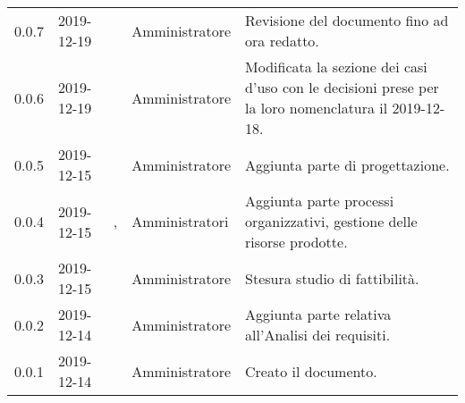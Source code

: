 {\begin{longtable}{C{2cm} C{2cm}  C{3cm}  C{3cm} C{4.5cm}}
0.0.7 & 2019-12-19 & \SE{} & Amministratore & Revisione del documento fino ad ora redatto. \\

0.0.6 & 2019-12-19 & \CE{} & Amministratore & Modificata la sezione dei casi d’uso con le decisioni prese per la loro nomenclatura il 2019-12-18. \\

0.0.5 & 2019-12-15 & \SE{} & Amministratore & Aggiunta parte di progettazione. \\

0.0.4 & 2019-12-15 & \BR{}, \PF{}  & Amministratori & Aggiunta parte processi organizzativi, gestione delle risorse prodotte. \\

0.0.3 & 2019-12-15 & \MC{} & Amministratore & Stesura studio di fattibilità. \\

0.0.2 & 2019-12-14 & \CE{} & Amministratore & Aggiunta parte relativa all’Analisi dei requisiti. \\

0.0.1 & 2019-12-14 & \CE{} & Amministratore & Creato il documento. \\
		
\end{longtable}
}